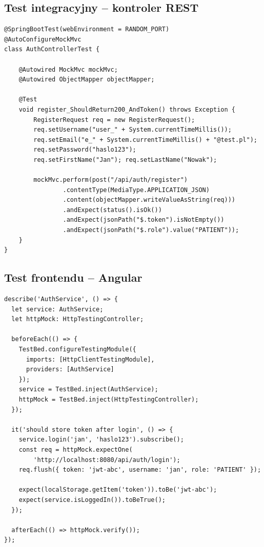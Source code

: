 \documentclass[12pt, a4paper]{article}
\begin{document}
\subsection{Test integracyjny -- kontroler REST}

\begin{lstlisting}[style=java, caption={Test integracyjny -- AuthControllerTest.java}]
@SpringBootTest(webEnvironment = RANDOM_PORT)
@AutoConfigureMockMvc
class AuthControllerTest {

    @Autowired MockMvc mockMvc;
    @Autowired ObjectMapper objectMapper;

    @Test
    void register_ShouldReturn200_AndToken() throws Exception {
        RegisterRequest req = new RegisterRequest();
        req.setUsername("user_" + System.currentTimeMillis());
        req.setEmail("e_" + System.currentTimeMillis() + "@test.pl");
        req.setPassword("haslo123");
        req.setFirstName("Jan"); req.setLastName("Nowak");

        mockMvc.perform(post("/api/auth/register")
                .contentType(MediaType.APPLICATION_JSON)
                .content(objectMapper.writeValueAsString(req)))
                .andExpect(status().isOk())
                .andExpect(jsonPath("$.token").isNotEmpty())
                .andExpect(jsonPath("$.role").value("PATIENT"));
    }
}
\end{lstlisting}

\subsection{Test frontendu -- Angular}

\begin{lstlisting}[style=java, caption={Test serwisu autoryzacji -- auth.spec.ts}]
describe('AuthService', () => {
  let service: AuthService;
  let httpMock: HttpTestingController;

  beforeEach(() => {
    TestBed.configureTestingModule({
      imports: [HttpClientTestingModule],
      providers: [AuthService]
    });
    service = TestBed.inject(AuthService);
    httpMock = TestBed.inject(HttpTestingController);
  });

  it('should store token after login', () => {
    service.login('jan', 'haslo123').subscribe();
    const req = httpMock.expectOne(
        'http://localhost:8080/api/auth/login');
    req.flush({ token: 'jwt-abc', username: 'jan', role: 'PATIENT' });

    expect(localStorage.getItem('token')).toBe('jwt-abc');
    expect(service.isLoggedIn()).toBeTrue();
  });

  afterEach(() => httpMock.verify());
});
\end{lstlisting}
\end{document}
